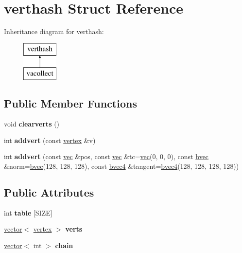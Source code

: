\hypertarget{structverthash}{}\section{verthash Struct Reference}
\label{structverthash}
Inheritance diagram for verthash\+:\begin{figure}[H]
\begin{center}
\leavevmode
\includegraphics[height=2.000000cm]{structverthash}
\end{center}
\end{figure}
\subsection*{Public Member Functions}
\begin{DoxyCompactItemize}
\item 
\mbox{\label{structverthash_a3d70655c715c302fa41b5f60ed5b245b}} 
void {\bfseries clearverts} ()
\item 
\mbox{\label{structverthash_a9a697898bdb7bb57a96bb32f853b2f7e}} 
int {\bfseries addvert} (const \hyperlink{structvertex}{vertex} \&v)
\item 
\mbox{\label{structverthash_ab76a5f96f3a4c3415fa9f858065c052b}} 
int {\bfseries addvert} (const \hyperlink{structvec}{vec} \&pos, const \hyperlink{structvec}{vec} \&tc=\hyperlink{structvec}{vec}(0, 0, 0), const \hyperlink{structbvec}{bvec} \&norm=\hyperlink{structbvec}{bvec}(128, 128, 128), const \hyperlink{structbvec4}{bvec4} \&tangent=\hyperlink{structbvec4}{bvec4}(128, 128, 128, 128))
\end{DoxyCompactItemize}
\subsection*{Public Attributes}
\begin{DoxyCompactItemize}
\item 
\mbox{\label{structverthash_a1724827a0b8c4a8e3b630f5234cf05ca}} 
int {\bfseries table} \mbox{[}S\+I\+ZE\mbox{]}
\item 
\mbox{\label{structverthash_a0210fc8253e303a67c4bc417c564288f}} 
\hyperlink{structvector}{vector}$<$ \hyperlink{structvertex}{vertex} $>$ {\bfseries verts}
\item 
\mbox{\label{structverthash_ac8f78a27dc09c740172f60274f3263e3}} 
\hyperlink{structvector}{vector}$<$ int $>$ {\bfseries chain}
\end{DoxyCompactItemize}
